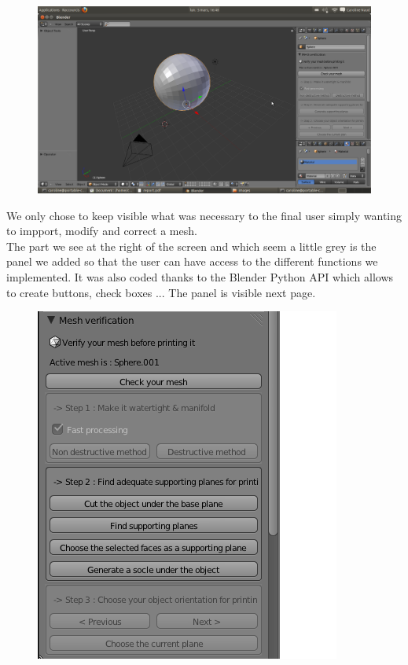 \documentclass{report}
\begin{document}
\bigskip
\bigskip

\begin{figure}[!h]
\begin{center}
	\includegraphics[scale=0.3]{NotreInterface}
\end{center}
\end{figure}

\bigskip
\bigskip

We only chose to keep visible what was necessary to the final user simply wanting to impport, modify and correct a mesh.\\

The part we see at the right of the screen and which seem a little grey is the panel we added so that the user can have access to the different functions we implemented. It was also coded thanks to the Blender Python API which allows to create buttons, check boxes ... The panel is visible next page.

\newpage

\bigskip
\begin{figure}[!h]
\begin{center}
	\includegraphics[scale=1]{Panel}
\end{center}
\end{figure}
\bigskip
\end{document}
